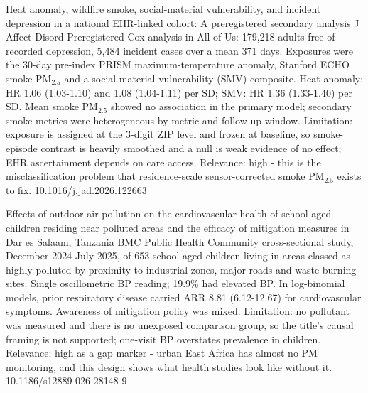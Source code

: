 \documentclass[10pt]{article}
\begin{document}
{Heat anomaly, wildfire smoke, social-material vulnerability, and incident depression in a national EHR-linked cohort: A preregistered secondary analysis}
{J Affect Disord}
{Preregistered Cox analysis in All of Us: 179,218 adults free of recorded depression, 5,484 incident cases over a mean 371 days. Exposures were the 30-day pre-index PRISM maximum-temperature anomaly, Stanford ECHO smoke PM$_{2.5}$ and a social-material vulnerability (SMV) composite. Heat anomaly: HR 1.06 (1.03-1.10) and 1.08 (1.04-1.11) per SD; SMV: HR 1.36 (1.33-1.40) per SD. Mean smoke PM$_{2.5}$ showed no association in the primary model; secondary smoke metrics were heterogeneous by metric and follow-up window. Limitation: exposure is assigned at the 3-digit ZIP level and frozen at baseline, so smoke-episode contrast is heavily smoothed and a null is weak evidence of no effect; EHR ascertainment depends on care access. Relevance: high - this is the misclassification problem that residence-scale sensor-corrected smoke PM$_{2.5}$ exists to fix.}
{10.1016/j.jad.2026.122663}

\par{}\baselineskip{}\baselineskip
{}

{Effects of outdoor air pollution on the cardiovascular health of school-aged children residing near polluted areas and the efficacy of mitigation measures in Dar es Salaam, Tanzania}
{BMC Public Health}
{Community cross-sectional study, December 2024-July 2025, of 653 school-aged children living in areas classed as highly polluted by proximity to industrial zones, major roads and waste-burning sites. Single oscillometric BP reading; 19.9\% had elevated BP. In log-binomial models, prior respiratory disease carried ARR 8.81 (6.12-12.67) for cardiovascular symptoms. Awareness of mitigation policy was mixed. Limitation: no pollutant was measured and there is no unexposed comparison group, so the title's causal framing is not supported; one-visit BP overstates prevalence in children. Relevance: high as a gap marker - urban East Africa has almost no PM monitoring, and this design shows what health studies look like without it.}
{10.1186/s12889-026-28148-9}

\par{}\baselineskip{}\baselineskip
{}
\end{document}
